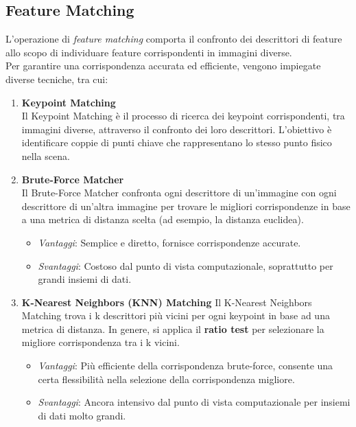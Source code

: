 \documentclass[12pt,a4paper,openright,twoside]{book}
\begin{document}
\subsection{Feature Matching}
L'operazione di {\itshape feature matching} comporta il confronto dei descrittori di feature allo scopo di individuare feature corrispondenti in immagini diverse. \\
Per garantire una corrispondenza accurata ed efficiente, vengono impiegate diverse tecniche, tra cui:

\begin{enumerate}

\item \textbf{Keypoint Matching}\\
Il Keypoint Matching è il processo di ricerca dei keypoint corrispondenti, tra immagini diverse, attraverso il confronto dei loro descrittori. L'obiettivo è identificare coppie di punti chiave che rappresentano lo stesso punto fisico nella scena.

\item \textbf{Brute-Force Matcher}\\
Il Brute-Force Matcher confronta ogni descrittore di un'immagine con ogni descrittore di un'altra immagine per trovare le migliori corrispondenze in base a una metrica di distanza scelta (ad esempio, la distanza euclidea).
\begin{itemize}
\item {\itshape Vantaggi}: Semplice e diretto, fornisce corrispondenze accurate.
\item {\itshape Svantaggi}: Costoso dal punto di vista computazionale, soprattutto per grandi insiemi di dati.
\end{itemize}

\item \textbf{K-Nearest Neighbors (KNN) Matching}
Il K-Nearest Neighbors Matching trova i k descrittori più vicini per ogni keypoint in base ad una metrica di distanza. In genere, si applica il \textbf{ratio test} per selezionare la migliore corrispondenza tra i k vicini.
\begin{itemize}
\item {\itshape Vantaggi}: Più efficiente della corrispondenza brute-force, consente una certa flessibilità nella selezione della corrispondenza migliore.
\item {\itshape Svantaggi}: Ancora intensivo dal punto di vista computazionale per insiemi di dati molto grandi.
\end{itemize}


\end{enumerate}
\end{document}
